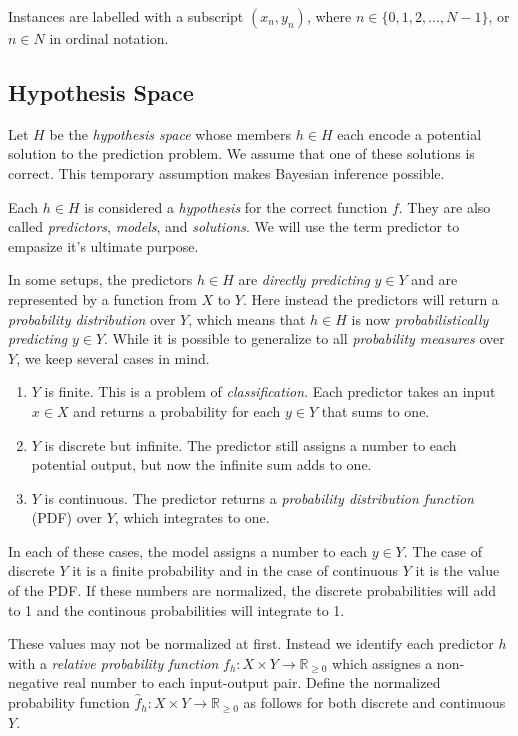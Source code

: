 \documentclass[twoside]{article}
\begin{document}
Instances are labelled with a subscript \((x_n, y_n)\), where \(n \in \{0, 1, 2,\ldots,N-1\}\), or \(n \in N\) in ordinal notation.

\subsection{Hypothesis Space}

Let \(H\) be the \textit{hypothesis space} whose members \(h \in H\) each encode a potential solution to the prediction problem. We assume that one of these solutions is correct. This temporary assumption makes Bayesian inference possible.

Each \(h \in H\) is considered a \textit{hypothesis} for the correct function \(f\). They are also called \textit{predictors}, \textit{models}, and \textit{solutions}. We will use the term predictor to empasize it's ultimate purpose.

In some setups, the predictors \(h \in H\) are \textit{directly predicting} \(y \in Y\) and are represented by a function from \(X\) to \(Y\). Here instead the predictors will return a \textit{probability distribution} over \(Y\), which means that \(h \in H\) is now \textit{probabilistically predicting} \(y \in Y\). While it is possible to generalize to all \textit{probability measures} over \(Y\), we keep several cases in mind.

\begin{enumerate}
	\item \(Y\) is finite. This is a problem of \textit{classification}. Each predictor takes an input \(x \in X\) and returns a probability for each \(y \in Y\) that sums to one.
	\item \(Y\) is discrete but infinite. The predictor still assigns a number to each potential output, but now the infinite sum adds to one.
	\item \(Y\) is continuous. The predictor returns a \textit{probability distribution function} (PDF) over \(Y\), which integrates to one.
\end{enumerate}

In each of these cases, the model assigns a number to each \(y \in Y\). The case of discrete \(Y\) it is a finite probability and in the case of continuous \(Y\) it is the value of the PDF. If these numbers are normalized, the discrete probabilities will add to 1 and the continous probabilities will integrate to 1.

These values may not be normalized at first. Instead we identify each predictor \(h\) with a \textit{relative probability function} \(f_h: X \times Y \rightarrow \mathbb{R}_{\geq 0}\) which assignes a non-negative real number to each input-output pair. Define the normalized probability function \(\hat{f}_h: X \times Y \rightarrow \mathbb{R}_{\geq 0}\) as follows for both discrete and continuous \(Y\).
\end{document}
